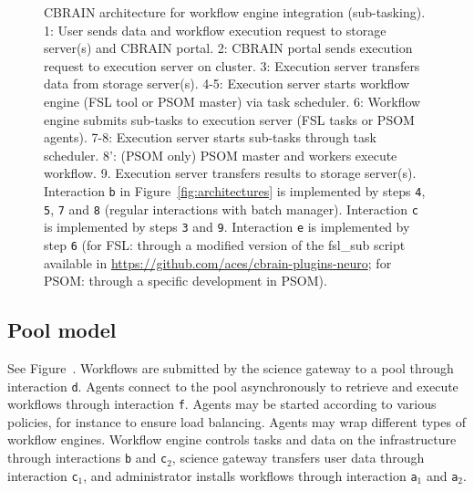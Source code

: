 \documentclass[preprint,3p,twocolumn]{elsarticle}
\begin{document}
\begin{figure}
\centering
{} \hfill {}
\caption{CBRAIN architecture for workflow engine integration
  (sub-tasking).  1: User sends data and workflow execution request to
  storage server(s) and CBRAIN portal. 2: CBRAIN portal sends
  execution request to execution server on cluster. 3: Execution
  server transfers data from storage server(s). 4-5: Execution server
  starts workflow engine (FSL tool or PSOM master) via task
  scheduler. 6: Workflow engine submits sub-tasks to execution server
  (FSL tasks or PSOM agents). 7-8: Execution server starts sub-tasks
  through task scheduler. 8': (PSOM only) PSOM master and workers
  execute workflow. 9. Execution server transfers results to storage
  server(s). Interaction \texttt{b} in Figure~\ref{fig:architectures}
  is implemented by steps \texttt{4}, \texttt{5}, \texttt{7} and
  \texttt{8} (regular interactions with batch manager). Interaction
  \texttt{c} is implemented by steps \texttt{3} and
  \texttt{9}. Interaction \texttt{e} is implemented by step \texttt{6}
  (for FSL: through a modified version of the fsl\_sub script
  available in \url{https://github.com/aces/cbrain-plugins-neuro}; for
  PSOM: through a specific development in PSOM).}
\label{fig:cbrain-sub-tasking}
\end{figure}

\subsection{Pool model}
\label{sec:pool}
See Figure~. Workflows are submitted by the science
gateway to a pool through interaction \texttt{d}. Agents connect to
the pool asynchronously to retrieve and execute workflows through
interaction \texttt{f}. Agents may be started according to various
policies, for instance to ensure load balancing. Agents may wrap
different types of workflow engines. Workflow engine controls tasks
and data on the infrastructure through interactions \texttt{b} and
\texttt{c$_2$}, science gateway transfers user data through
interaction \texttt{c$_1$}, and administrator installs workflows
through interaction \texttt{a$_1$} and \texttt{a$_2$}.
\end{document}
